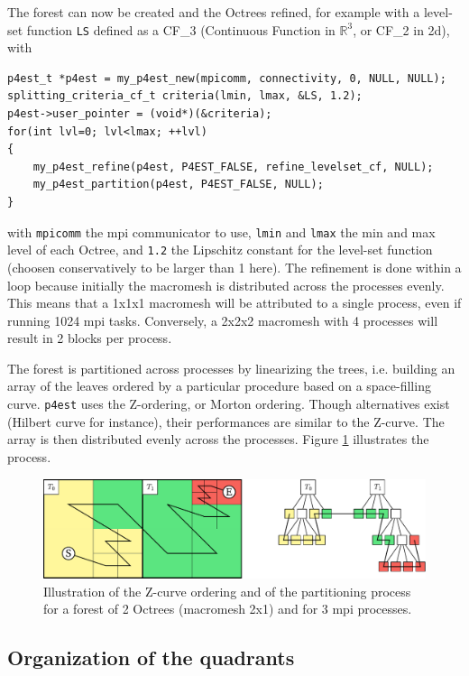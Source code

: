 \documentclass{article}
\newcommand{\ttt}[1]{\texttt{#1}}
\newcommand{\figb}{\begin{figure}[htbp]\begin{center}}
\newcommand{\fige}{\end{center}\end{figure}}
\begin{document}
The forest can now be created and the Octrees refined, for example with a level-set function \ttt{LS} defined as a CF\_3 (Continuous Function in $\mathbb{R}^3$, or CF\_2 in 2d), with
\begin{Verbatim}[frame=single]
p4est_t *p4est = my_p4est_new(mpicomm, connectivity, 0, NULL, NULL);
splitting_criteria_cf_t criteria(lmin, lmax, &LS, 1.2);
p4est->user_pointer = (void*)(&criteria);
for(int lvl=0; lvl<lmax; ++lvl)
{
	my_p4est_refine(p4est, P4EST_FALSE, refine_levelset_cf, NULL);
	my_p4est_partition(p4est, P4EST_FALSE, NULL);
}
\end{Verbatim}
with \ttt{mpicomm} the mpi communicator to use, \ttt{lmin} and \ttt{lmax} the min and max level of each Octree, and \ttt{1.2} the Lipschitz constant for the level-set function (choosen conservatively to be larger than 1 here). The refinement is done within a loop because initially the macromesh is distributed across the processes evenly. This means that a 1x1x1 macromesh will be attributed to a single process, even if running 1024 mpi tasks. Conversely, a 2x2x2 macromesh with 4 processes will result in 2 blocks per process.

The forest is partitioned across processes by linearizing the trees, i.e. building an array of the leaves ordered by a particular procedure based on a space-filling curve. \ttt{p4est} uses the Z-ordering, or Morton ordering. Though alternatives exist (Hilbert curve for instance), their performances are similar to the Z-curve. The array is then distributed evenly across the processes. Figure \ref{fig::zcurve} illustrates the process.
\figb
\includegraphics[width=.9\textwidth]{figures/p4est_zcurve.pdf}
\caption{Illustration of the Z-curve ordering and of the partitioning process for a forest of 2 Octrees (macromesh 2x1) and for 3 mpi processes.} \label{fig::zcurve}
\fige


\subsection{Organization of the quadrants}
\end{document}
